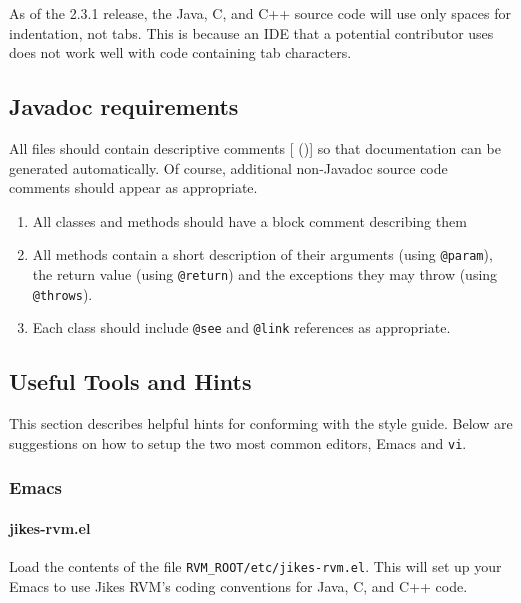 As of the \jrvm{} 2.3.1 release, the Java, C, and C++ source code will
use only spaces for indentation, not tabs.  This is because an IDE
that a potential contributor uses does not work well with code
containing tab characters.  

\subsection {Javadoc requirements}

All files should contain descriptive comments
[ (\texttt{\JavadocURL})]{\JavadocURL}
so
that documentation can be generated automatically.  Of course,
additional non-Javadoc source code comments should appear as
appropriate.

\begin{enumerate}
\item All classes and methods should have a block comment describing
them
\item All methods contain a short description of their arguments
(using {\tt @param}), the return value (using {\tt @return}) and the
exceptions they may throw (using {\tt @throws}).
\item Each class should include {\tt @see} and {\tt @link} 
references as appropriate.
\end{enumerate}

\subsection{Useful Tools and Hints}

This section describes helpful hints for conforming with the style
guide.  Below are suggestions on how to setup the two most common
editors, Emacs and \texttt{vi}. 

\subsubsection{Emacs}

\paragraph{jikes-rvm.el}

Load the contents of the
file \texttt{RVM\_ROOT/etc/jikes-rvm.el}.  This will set up your
Emacs to use Jikes RVM's coding conventions for Java, C, and C++ code.

